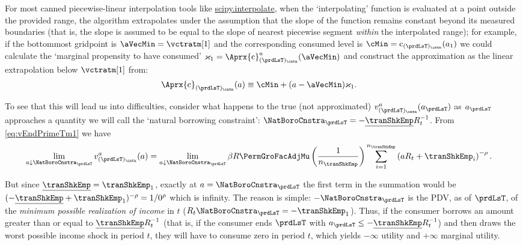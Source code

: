 \documentclass[titlepage, headings=optiontotocandhead]{econtex}
\begin{document}
For most canned piecewise-linear interpolation tools like \href{https://docs.scipy.org/doc/scipy/tutorial/interpolate.html}{scipy.interpolate}, when the `interpolating' function is evaluated at a point outside the provided range, the algorithm extrapolates under the assumption that the slope of the function remains constant beyond its measured boundaries (that is, the slope is assumed to be equal to the slope of nearest piecewise segment \emph{within} the interpolated range); for example, if the bottommost gridpoint is $\aVecMin = \vctratm[1]$ and the corresponding consumed level is $\cMin = \mathrm{c}_{(\prdLsT)_\cntn}(a_1)$ we could calculate the `marginal propensity to have consumed' $\varkappa_{1}=
\Aprx{\mathrm{c}}_{(\prdLsT)_\cntn}^{a}(\aVecMin)$ and construct the approximation as the linear extrapolation below $\vctratm[1]$ from:
\begin{equation}\begin{gathered}\begin{aligned}
      \Aprx{\mathrm{c}}_{(\prdLsT)_\cntn}(a)  &  \equiv \cMin + (a-\aVecMin)\varkappa_{1}  \label{eq:ExtrapLin}.
    \end{aligned}\end{gathered}\end{equation}

To see that this will lead us into difficulties, consider what happens to the true (not approximated) $v^{a}_{(\prdLsT)_\cntn}(a_{\prdLsT})$ as $a_{\prdLsT}$ approaches a quantity we will call the `natural borrowing constraint': $\NatBoroCnstra_{\prdLsT}=-\underline{\tranShkEmp}R_{t}^{-1}$.  From
\eqref{eq:vEndPrimeTm1} we have
\begin{equation}\begin{gathered}\begin{aligned}
      \lim_{a \downarrow \NatBoroCnstra_{\prdLsT}} v^{a}_{(\prdLsT)_\cntn}(a)
      & =                                                                                         \lim_{a \downarrow \NatBoroCnstra_{\prdLsT}} \beta R \PermGroFacAdjMu \left(\frac{1}{n_{\tranShkEmp}}\right) \sum_{i=1}^{n_{\tranShkEmp}} \left( a R_{t}+ \tranShkEmp_{i}\right)^{-\rho}.
    \end{aligned}\end{gathered}\end{equation}

But since $\underline{\tranShkEmp}=\tranShkEmp_{1}$, exactly at $a=\NatBoroCnstra_{\prdLsT}$ the first term in the summation would be $(-\underline{\tranShkEmp}+\tranShkEmp_{1})^{-\rho}=1/0^{\rho}$ which is infinity.  The reason is simple: $-\NatBoroCnstra_{\prdLsT}$ is the PDV, as of $\prdLsT$, of the \emph{minimum possible realization of income} in $t$ ($R_{t}\NatBoroCnstra_{\prdLsT} = -\tranShkEmp_{1}$).  Thus, if the consumer borrows an amount greater than or equal to $\underline{\tranShkEmp}R_{t}^{-1}$ (that is, if the consumer ends $\prdLsT$ with $a_{\prdLsT} \leq -\underline{\tranShkEmp}R_{t}^{-1}$) and then draws the worst possible income shock in period $t$, they will have to consume zero in period $t$, which yields $-\infty$ utility and $+\infty$ marginal utility.
\end{document}
